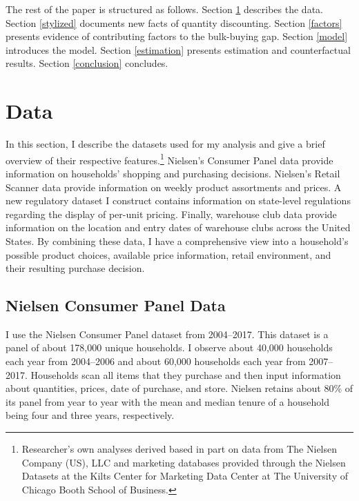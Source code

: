 \documentclass[AER]{AEA_mal}
\begin{document}
The rest of the paper is structured as follows. Section \ref{data} describes the data. Section \ref{stylized} documents new facts of quantity discounting. Section \ref{factors} presents evidence of contributing factors to the bulk-buying gap. Section \ref{model} introduces the model. Section \ref{estimation} presents estimation and counterfactual results. Section \ref{conclusion} concludes.

\section{Data}
\label{data}
In this section, I describe the datasets used for my analysis and give a brief overview of their respective features.\footnote{Researcher's own analyses derived based in part on data from The Nielsen Company (US), LLC and marketing databases provided through the Nielsen Datasets at the Kilts Center for Marketing Data Center at The University of Chicago Booth School of Business.} Nielsen's Consumer Panel data provide information on households' shopping and purchasing decisions. Nielsen's Retail Scanner data provide information on weekly product assortments and prices. A new regulatory dataset I construct contains information on state-level regulations regarding the display of per-unit pricing. Finally, warehouse club data provide information on the location and entry dates of warehouse clubs across the United States. By combining these data, I have a comprehensive view into a household's possible product choices, available price information, retail environment, and their resulting purchase decision.

\subsection{Nielsen Consumer Panel Data}

I use the Nielsen Consumer Panel dataset from 2004--2017. This dataset is a panel of about 178,000 unique households. I observe about 40,000 households each year from 2004--2006 and about 60,000 households each year from 2007--2017. Households scan all items that they purchase and then input information about quantities, prices, date of purchase, and store. Nielsen retains about 80\% of its panel from year to year with the mean and median tenure of a household being four and three years, respectively.
\end{document}
